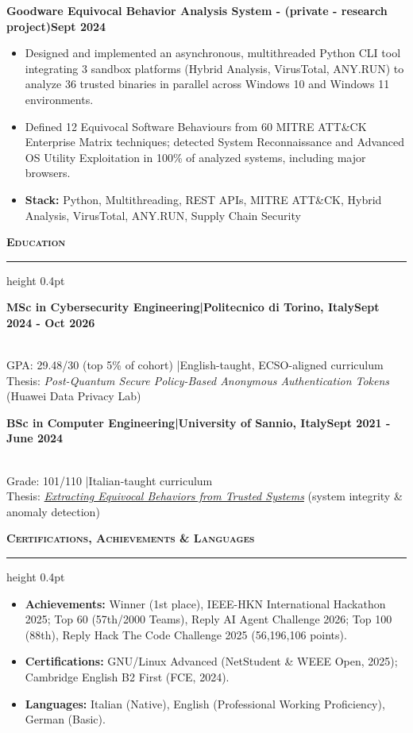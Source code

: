 \documentclass[a4paper,10pt]{article}
\newcommand{\cventry}[2]{\noindent\begin{minipage}[t]{\linewidth}\textbf{#1}\hfill\textbf{#2}\end{minipage}}
\newcommand{\mysection}[1]{%
  \vspace{0.3ex}
  {\large\bfseries\scshape\color{myblue} #1}\enspace%
  \leaders\hrule height 0.4pt\hfill\kern0pt
  \vspace{-0.2em}
}
\begin{document}
\vspace{0.2em}
\cventry{\textbf{Goodware Equivocal Behavior Analysis System} - (private - research project)}{Sept 2024}
\begin{itemize}
    \item Designed and implemented an asynchronous, multithreaded Python CLI tool integrating 3 sandbox platforms (Hybrid Analysis, VirusTotal, ANY.RUN) to analyze 36 trusted binaries in parallel across Windows 10 and Windows 11 environments.
    \item Defined 12 Equivocal Software Behaviours from 60 MITRE ATT\&CK Enterprise Matrix techniques; detected System Reconnaissance and Advanced OS Utility Exploitation in 100\% of analyzed systems, including major browsers.
    \item \textbf{Stack:} Python, Multithreading, REST APIs, MITRE ATT\&CK, Hybrid Analysis, VirusTotal, ANY.RUN, Supply Chain Security
\end{itemize}


\mysection{Education}
\cventry{MSc in Cybersecurity Engineering\enspace|\enspace Politecnico di Torino, Italy}{Sept 2024 - Oct 2026}\\
GPA: 29.48/30 (top 5\% of cohort) \enspace|\enspace English-taught, ECSO-aligned curriculum\\
Thesis: \textit{Post-Quantum Secure Policy-Based Anonymous Authentication Tokens} (Huawei Data Privacy Lab)\\
\vspace{0.15em}
\cventry{BSc in Computer Engineering\enspace|\enspace University of Sannio, Italy}{Sept 2021 - June 2024}\\
Grade: 101/110 \enspace|\enspace Italian-taught curriculum\\
Thesis: \href{https://zenodo.org/records/19262869}{\textit{Extracting Equivocal Behaviors from Trusted Systems}} (system integrity \& anomaly detection)

\mysection{Certifications, Achievements \& Languages}

\begin{itemize}
    \item \textbf{Achievements:} Winner (1st place), IEEE-HKN International Hackathon 2025; Top 60 (57th/2000 Teams), Reply AI Agent Challenge 2026; Top 100 (88th), Reply Hack The Code Challenge 2025 (56,196,106 points).
    \item \textbf{Certifications:} GNU/Linux Advanced (NetStudent \& WEEE Open, 2025); Cambridge English B2 First (FCE, 2024).
    \item \textbf{Languages:} Italian (Native), English (Professional Working Proficiency), German (Basic).
\end{itemize}
\end{document}
